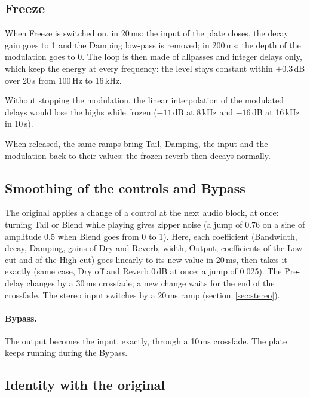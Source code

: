 \documentclass[a4paper,11pt]{article}
\newcommand{\dB}{\,dB}
\begin{document}
\subsection{Freeze}\label{sec:freeze}

When Freeze is switched on, in 20\,ms: the input of the plate closes, the decay gain goes to 1
and the Damping low-pass is removed; in 200\,ms: the depth of the modulation goes to 0. The loop
is then made of allpasses and integer delays only, which keep the energy at every frequency:
the level stays constant within $\pm0.3$\dB{} over 20\,s from 100\,Hz to 16\,kHz.

Without stopping the modulation, the linear interpolation of the modulated delays would lose the
highs while frozen ($-11$\dB{} at 8\,kHz and $-16$\dB{} at 16\,kHz in 10\,s).

When released, the same ramps bring Tail, Damping, the input and the modulation back to their
values: the frozen reverb then decays normally.

\subsection{Smoothing of the controls and Bypass}\label{sec:smoothing}

The original applies a change of a control at the next audio block, at once: turning Tail or
Blend while playing gives zipper noise (a jump of 0.76 on a sine of amplitude 0.5 when Blend
goes from 0 to 1). Here, each coefficient (Bandwidth, decay, Damping, gains of Dry and Reverb,
width, Output, coefficients of the Low cut and of the High cut) goes linearly to its new value in
20\,ms, then takes it exactly (same case, Dry off and Reverb 0\dB{} at once: a jump of 0.025).
The Pre-delay changes by a 30\,ms crossfade; a new change waits for the end of the crossfade.
The stereo input switches by a 20\,ms ramp (section~\ref{sec:stereo}).

\paragraph{Bypass.} The output becomes the input, exactly, through a 10\,ms crossfade. The plate
keeps running during the Bypass.

\subsection{Identity with the original}\label{sec:identity}
\end{document}
